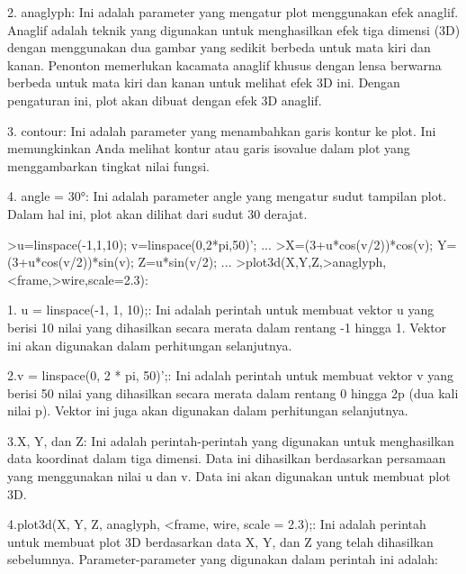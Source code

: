 \documentclass[a4paper,10pt]{article}
\begin{document}
\begin{eulernotebook}
\begin{eulercomment}
\begin{eulercomment}
\begin{eulercomment}
\begin{eulercomment}
\begin{eulercomment}
\begin{eulercomment}
\begin{eulercomment}
\begin{eulercomment}
\begin{eulercomment}
2. anaglyph: Ini adalah parameter yang mengatur plot menggunakan efek
anaglif. Anaglif adalah teknik yang digunakan untuk menghasilkan efek
tiga dimensi (3D) dengan menggunakan dua gambar yang sedikit berbeda
untuk mata kiri dan kanan. Penonton memerlukan kacamata anaglif khusus
dengan lensa berwarna berbeda untuk mata kiri dan kanan untuk melihat
efek 3D ini. Dengan pengaturan ini, plot akan dibuat dengan efek 3D
anaglif.

3. contour: Ini adalah parameter yang menambahkan garis kontur ke
plot. Ini memungkinkan Anda melihat kontur atau garis isovalue dalam
plot yang menggambarkan tingkat nilai fungsi.

4. angle = 30°: Ini adalah parameter angle yang mengatur sudut
tampilan plot. Dalam hal ini, plot akan dilihat dari sudut 30 derajat.
\end{eulercomment}
\begin{eulerprompt}
>u=linspace(-1,1,10); v=linspace(0,2*pi,50)'; ...
>X=(3+u*cos(v/2))*cos(v); Y=(3+u*cos(v/2))*sin(v); Z=u*sin(v/2); ...
>plot3d(X,Y,Z,>anaglyph,<frame,>wire,scale=2.3):
\end{eulerprompt}
\begin{eulercomment}
1. u = linspace(-1, 1, 10);: Ini adalah perintah untuk membuat vektor
u yang berisi 10 nilai yang dihasilkan secara merata dalam rentang -1
hingga 1. Vektor ini akan digunakan dalam perhitungan selanjutnya.

2.v = linspace(0, 2 * pi, 50)';: Ini adalah perintah untuk membuat
vektor v yang berisi 50 nilai yang dihasilkan secara merata dalam
rentang 0 hingga 2p (dua kali nilai p). Vektor ini juga akan digunakan
dalam perhitungan selanjutnya.

3.X, Y, dan Z: Ini adalah perintah-perintah yang digunakan untuk
menghasilkan data koordinat dalam tiga dimensi. Data ini dihasilkan
berdasarkan persamaan yang menggunakan nilai u dan v. Data ini akan
digunakan untuk membuat plot 3D.

4.plot3d(X, Y, Z, anaglyph, \textless{}frame, wire, scale = 2.3);: Ini adalah
perintah untuk membuat plot 3D berdasarkan data X, Y, dan Z yang telah
dihasilkan sebelumnya. Parameter-parameter yang digunakan dalam
perintah ini adalah:


\end{eulercomment}
\end{eulercomment}
\end{eulercomment}
\end{eulercomment}
\end{eulercomment}
\end{eulercomment}
\end{eulercomment}
\end{eulercomment}
\end{eulercomment}
\end{eulernotebook}
\end{document}
